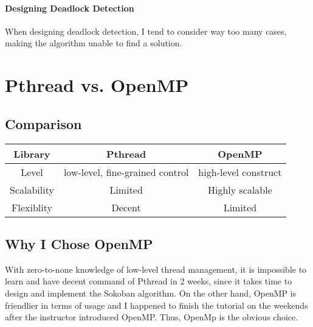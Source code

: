 \documentclass[a4paper, 10pt]{article}
\begin{document}
        \paragraph{Designing Deadlock Detection}
            When designing deadlock detection, I tend to consider way too many cases, 
            making the algorithm unable to find a solution.

    \section{Pthread vs. OpenMP}
        \subsection{Comparison}
            \begin{center}
                \begin{tabular}{|c|c|c|}
                    \hline
                    Library & Pthread & OpenMP \\
                    \hline
                    Level & low-level, fine-grained control & high-level construct \\
                    \hline
                    Scalability & Limited & Highly scalable \\
                    \hline
                    Flexiblity & Decent & Limited \\
                    \hline
                \end{tabular}
            \end{center}

        \subsection{Why I Chose OpenMP}
            With zero-to-none knowledge of low-level thread management, it is impossible to learn and 
            have decent command of Pthread in 2 weeks, since it takes time to 
            design and implement the Sokoban algorithm. On the other hand, OpenMP is friendlier in terms of 
            usage and I happened to finish the tutorial on the weekends after the instructor introduced OpenMP.
            Thus, OpenMp is the obvious choice.
\end{document}
